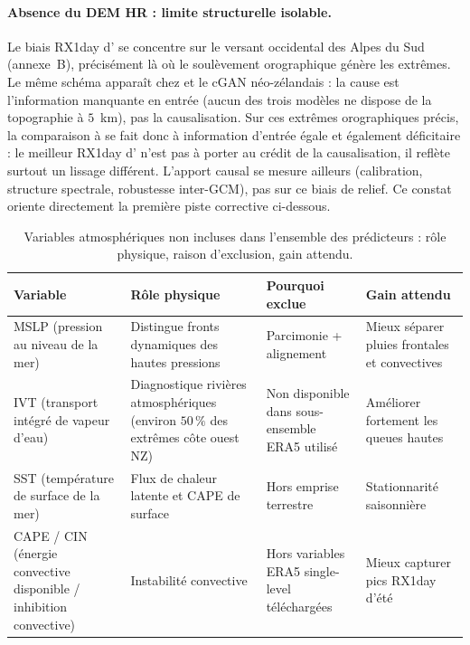 \paragraph{Absence du DEM HR : limite structurelle isolable.} Le biais RX1day d'\Oracle{} se concentre sur le versant occidental des Alpes du Sud (annexe~B), précisément là où le soulèvement orographique génère les extrêmes. Le même schéma apparaît chez \CorrDiff{} et le cGAN néo-zélandais : la cause est l'information manquante en entrée (aucun des trois modèles ne dispose de la topographie à $5$~km), pas la causalisation. Sur ces extrêmes orographiques précis, la comparaison à \CorrDiff{} se fait donc à information d'entrée égale et également déficitaire : le meilleur RX1day d'\Oracle{} n'est pas à porter au crédit de la causalisation, il reflète surtout un lissage différent. L'apport causal se mesure ailleurs (calibration, structure spectrale, robustesse inter-GCM), pas sur ce biais de relief. Ce constat oriente directement la première piste corrective ci-dessous.

\begin{table}[H]
  \centering
  \small
  \caption[Variables atmosphériques omises]{Variables atmosphériques non incluses dans l'ensemble des prédicteurs \LR{} : rôle physique, raison d'exclusion, gain attendu.}
  \label{tab:exp-vars-missing}
  \begin{tabularx}{\linewidth}{l X X X}
    \toprule
    \textbf{Variable} & \textbf{Rôle physique} & \textbf{Pourquoi exclue} & \textbf{Gain attendu} \\
    \midrule
    MSLP (pression au niveau de la mer) & Distingue fronts dynamiques des hautes pressions & Parcimonie + alignement \CorrDiff{} & Mieux séparer pluies frontales et convectives \\
    IVT (transport intégré de vapeur d'eau) & Diagnostique rivières atmosphériques (environ $50\,\%$ des extrêmes côte ouest NZ) & Non disponible dans sous-ensemble ERA5 utilisé & Améliorer fortement les queues hautes \\
    SST (température de surface de la mer) & Flux de chaleur latente et CAPE de surface & Hors emprise terrestre & Stationnarité saisonnière \\
    CAPE / CIN (énergie convective disponible / inhibition convective) & Instabilité convective & Hors variables ERA5 single-level téléchargées & Mieux capturer pics RX1day d'été \\
    \bottomrule
  \end{tabularx}
\end{table}

